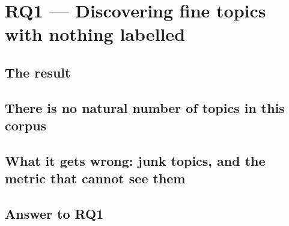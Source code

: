 \section{RQ1 --- Discovering fine topics with nothing labelled}
\label{sec:rq1}

\subsection{The result}

\subsection{There is no natural number of topics in this corpus}
\label{sec:rq1-nok}

\subsection{What it gets wrong: junk topics, and the metric that cannot see them}
\label{sec:rq1-junk}

\subsection{Answer to RQ1}

